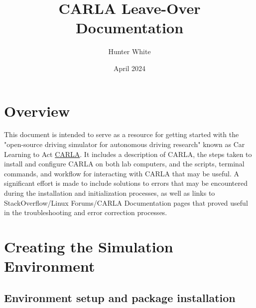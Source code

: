 \documentclass[12pt,oneside,letterpaper]{article}
\title{CARLA Leave-Over Documentation}
\author{Hunter White}
\date{April 2024}
\begin{document}
\maketitle
\newpage
\tableofcontents
\newpage


\section{Overview}
\label{sec:Overview}
This document is intended to serve as a resource for getting started with the "open-source driving simulator for autonomous driving research" known as Car Learning to Act \href{https://carla.org/}{CARLA}. It includes a description of CARLA, the steps taken to install and configure CARLA on both lab computers, and the scripts, terminal commands, and workflow for interacting with CARLA that may be useful. A significant effort is made to include solutions to errors that may be encountered during the installation and initialization processes, as well as links to StackOverflow/Linux Forums/CARLA Documentation pages that proved useful in the troubleshooting and error correction processes.
\section{Creating the Simulation Environment}

\subsection{Environment setup and package installation}
\end{document}
